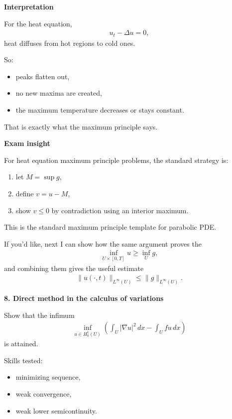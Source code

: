 \documentclass[12pt,a4paper]{report}
\begin{document}
\begin{description}
\begin{description}
\item \textbf{Interpretation}

For the heat equation,
\begin{align*}
u_t-\Delta u=0,
\end{align*}
heat diffuses from hot regions to cold ones.

So:

	\begin{itemize}
    \item peaks flatten out,
    \item no new maxima are created,
    \item the maximum temperature decreases or stays constant.
	\end{itemize}

That is exactly what the maximum principle says.

\item \textbf{Exam insight}

For heat equation maximum principle problems, the standard strategy is:

\begin{enumerate}
\item let $M=\sup g$,
\item define $v=u-M$,
\item show $v\le 0$ by contradiction using an interior maximum.
\end{enumerate}

This is the standard maximum principle template for parabolic PDE.
\end{description}

If you'd like, next I can show how the same argument proves the 
\begin{align*}
\inf_{U\times[0,T]}u\ge \inf_U g,
\end{align*}
and combining them gives the useful estimate
\begin{align*}
\|u(\cdot,t)\|_{L^\infty(U)}\le \|g\|_{L^\infty(U)}.
\end{align*}


\newpage\item \textbf{8. Direct method in the calculus of variations}

Show that the infimum
\begin{align*}
\inf_{u\in H_0^1(U)} \left( \int_U |\nabla u|^2\,dx-\int_U fu\,dx \right)
\end{align*}
is attained.

Skills tested:

	\begin{itemize}
    \item minimizing sequence,
    \item weak convergence,
    \item weak lower semicontinuity.
	\end{itemize}


\end{description}
\end{document}
